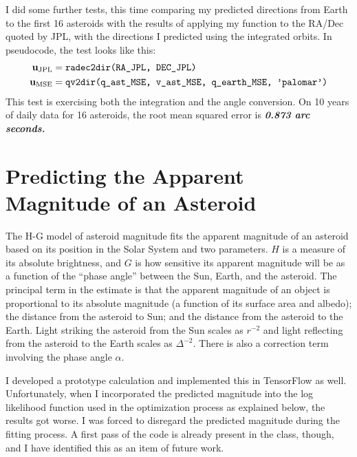 I did some further tests, this time comparing my predicted directions from Earth to the first 16 asteroids 
with the results of applying my  function to the RA/Dec quoted by JPL,
with the directions I predicted using the integrated orbits.  In pseudocode, the test looks like this:
\begin{align*}
\mathbf{u}_{\mathrm{JPL}} &= \texttt{radec2dir(RA\_JPL, DEC\_JPL)} \\
\mathbf{u}_{\mathrm{MSE}} &= \texttt{qv2dir(q\_ast\_MSE, v\_ast\_MSE, q\_earth\_MSE, 'palomar')}
\end{align*}
This test is exercising both the integration and the angle conversion.
On 10 years of daily data for 16 asteroids, the root mean squared error is \textbf{\emph{0.873 arc seconds.}}

\section{Predicting the Apparent Magnitude of an Asteroid}
\label{section_mag}
The H-G model of asteroid magnitude fits the apparent magnitude of an asteroid based on its 
position in the Solar System and two parameters.
$H$ is a measure of its absolute brightness, and $G$ is how sensitive its apparent magnitude will be as
 a function of the ``phase angle'' between the Sun, Earth, and the asteroid.
The principal term in the estimate is that the apparent magnitude of an object is proportional
to its absolute magnitude (a function of its surface area and albedo); 
the distance from the asteroid to Sun; and the distance from the asteroid to the Earth.
Light striking the asteroid from the Sun scales as $r^{-2}$ 
and light reflecting from the asteroid to the Earth scales as $\Delta^{-2}$.
There is also a correction term involving the phase angle $\alpha$.

I developed a prototype calculation and implemented this in TensorFlow as well.
Unfortunately, when I incorporated the predicted magnitude into the log likelihood function
used in the optimization process as explained below, the results got worse.
I was forced to disregard the predicted magnitude during the fitting process.
A first pass of the code is already present in the  class, though,
and I have identified this as an item of future work.

